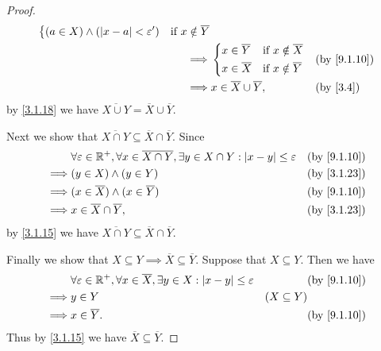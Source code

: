 \begin{proof}
\begin{align*}
\begin{dcases}
                 (a \in X) \land (\abs{x - a} < \varepsilon') & \text{if } x \notin \overline{Y}
               \end{dcases}                                                         \\
    \implies & \begin{dcases}
                 x \in \overline{Y} & \text{if } x \notin \overline{X} \\
                 x \in \overline{X} & \text{if } x \notin \overline{Y}
               \end{dcases}                                                               &  & \by{9.1.10}                                             \\
    \implies & x \in \overline{X} \cup \overline{Y},                                                                                  &  & \by{3.4}
  \end{align*}
  by \cref{3.1.18} we have \(\overline{X \cup Y} = \overline{X} \cup \overline{Y}\).

  Next we show that \(\overline{X \cap Y} \subseteq \overline{X} \cap \overline{Y}\).
  Since
  \begin{align*}
             & \forall \varepsilon \in \R^+, \forall x \in \overline{X \cap Y}, \exists y \in X \cap Y : \abs{x - y} \leq \varepsilon &  & \by{9.1.10} \\
    \implies & (y \in X) \land (y \in Y)                                                                                              &  & \by{3.1.23} \\
    \implies & (x \in \overline{X}) \land (x \in \overline{Y})                                                                        &  & \by{9.1.10} \\
    \implies & x \in \overline{X} \cap \overline{Y},                                                                                  &  & \by{3.1.23}
  \end{align*}
  by \cref{3.1.15} we have \(\overline{X \cap Y} \subseteq \overline{X} \cap \overline{Y}\).

  Finally we show that \(X \subseteq Y \implies \overline{X} \subseteq \overline{Y}\).
  Suppose that \(X \subseteq Y\).
  Then we have
  \begin{align*}
             & \forall \varepsilon \in \R^+, \forall x \in \overline{X}, \exists y \in X : \abs{x - y} \leq \varepsilon &                 & \by{9.1.10} \\
    \implies & y \in Y                                                                                                  & (X \subseteq Y)               \\
    \implies & x \in \overline{Y}.                                                                                      &                 & \by{9.1.10}
  \end{align*}
  Thus by \cref{3.1.15} we have \(\overline{X} \subseteq \overline{Y}\).
\end{proof}

